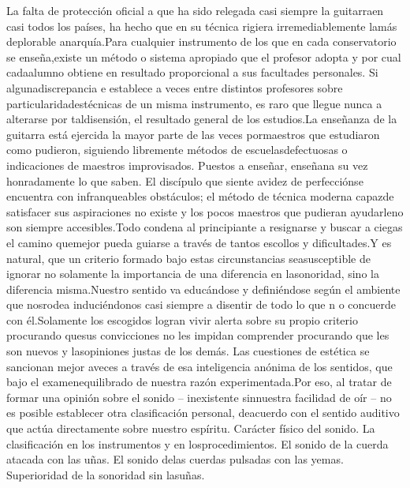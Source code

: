 \documentclass[
11pt, %
a4paper, %
oneside, %
headinclude,footinclude, %
BCOR5mm, %
]{scrartcl}
\begin{document}
{La falta de protección oficial a que ha sido relegada casi siempre la guitarraen casi todos los países, ha hecho que en su técnica rigiera irremediablemente lamás deplorable anarquía.Para cualquier instrumento de los que en cada conservatorio se enseña,existe un método o sistema apropiado que el profesor adopta y por cual cadaalumno obtiene en resultado proporcional a sus facultades personales. Si algunadiscrepancia e establece a veces entre distintos profesores sobre particularidadestécnicas de un misma instrumento, es raro que llegue nunca a alterarse por taldisensión, el resultado general de los estudios.La enseñanza de la guitarra está ejercida la mayor parte de las veces pormaestros que estudiaron como pudieron, siguiendo libremente métodos de escuelasdefectuosas o indicaciones de maestros improvisados. Puestos a enseñar, enseñana su vez honradamente lo que saben. El discípulo que siente avidez de perfecciónse encuentra con infranqueables obstáculos; el método de técnica moderna capazde satisfacer sus aspiraciones no existe y los pocos maestros que pudieran ayudarleno son siempre accesibles.Todo condena al principiante a resignarse y buscar a ciegas el camino quemejor pueda guiarse a través de tantos escollos y dificultades.Y es natural, que un criterio formado bajo estas circunstancias seasusceptible de ignorar no solamente la importancia de una diferencia en lasonoridad, sino la diferencia misma.Nuestro sentido va educándose y definiéndose según el ambiente que nosrodea induciéndonos casi siempre a disentir de todo lo que n o concuerde con él.Solamente los escogidos logran vivir alerta sobre su propio criterio procurando quesus convicciones no les impidan comprender procurando que les son nuevos y lasopiniones justas de los demás. Las cuestiones de estética se sancionan mejor aveces a través de esa inteligencia anónima de los sentidos, que bajo el examenequilibrado de nuestra razón experimentada.Por eso, al tratar de formar una opinión sobre el sonido – inexistente sinnuestra facilidad de oír – no es posible establecer otra clasificación personal, deacuerdo con el sentido auditivo que actúa directamente sobre nuestro espíritu. Carácter físico del sonido. La clasificación en los instrumentos y en losprocedimientos. El sonido de la cuerda atacada con las uñas. El sonido delas cuerdas pulsadas con las yemas. Superioridad de la sonoridad sin lasuñas.
}
\end{document}
